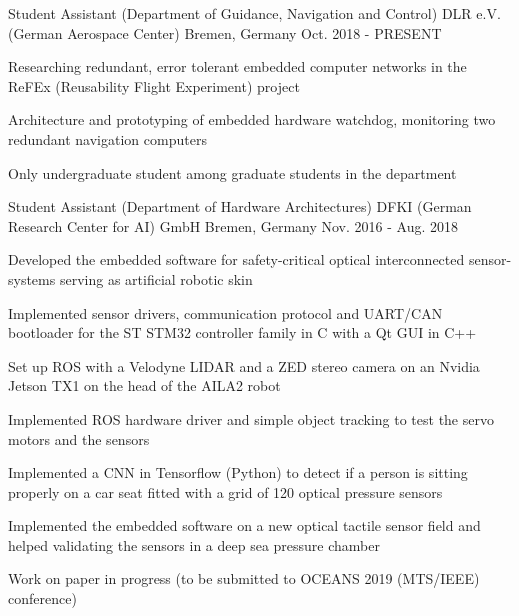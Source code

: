 

\begin{cventries}

  \cventry
    {Student Assistant (Department of Guidance, Navigation and Control)} %
    {DLR e.V. (German Aerospace Center)} %
    {Bremen, Germany} %
    {Oct. 2018 - PRESENT} %
    {
      \begin{cvitems} %
        \item {Researching redundant, error tolerant embedded computer networks in the ReFEx (Reusability Flight Experiment) project}
        \item {Architecture and prototyping of embedded hardware watchdog, monitoring two redundant navigation computers}
        \item {Only undergraduate student among graduate students in the department}
      \end{cvitems}
    }
    
  \cventry
    {Student Assistant (Department of Hardware Architectures)} %
    {DFKI (German Research Center for AI) GmbH} %
    {Bremen, Germany} %
    {Nov. 2016 - Aug. 2018} %
    {
      \begin{cvitems} %
        \item {Developed the embedded software for safety-critical optical interconnected sensor-systems serving as artificial robotic skin}
        \item {Implemented sensor drivers, communication protocol and UART/CAN bootloader for the ST STM32 controller family in C with a Qt GUI in C++}
        \item {Set up ROS with a Velodyne LIDAR and a ZED stereo camera on an Nvidia Jetson TX1 on the head of the AILA2 robot}
        \item {Implemented ROS hardware driver and simple object tracking to test the servo motors and the sensors}
        \item {Implemented a CNN in Tensorflow (Python) to detect if a person is sitting properly on a car seat fitted with a grid of 120 optical pressure sensors}
        \item {Implemented the embedded software on a new optical tactile sensor field and helped validating the sensors in a deep sea pressure chamber}
        \item {Work on paper in progress (to be submitted to OCEANS 2019 (MTS/IEEE) conference)}
      \end{cvitems}
    }


\end{cventries}
